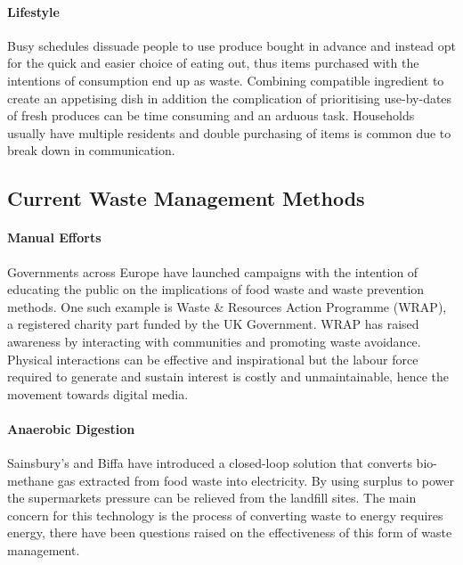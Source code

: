 \documentclass[a4paper, 11pt]{article}
\begin{document}
\paragraph{Lifestyle} Busy schedules dissuade people to use produce bought in advance and instead opt for the quick and easier choice of eating out, thus items purchased with the intentions of consumption end up as waste.\cite{motivation} Combining compatible ingredient to create an appetising dish in addition the complication of prioritising use-by-dates of fresh produces can be time consuming and an arduous task. Households usually have multiple residents and double purchasing of items is common due to break down in communication.

\vspace{\baselineskip}
\vspace{\baselineskip}
\vspace{\baselineskip}

\subsection{Current Waste Management Methods}

\paragraph{Manual Efforts}
Governments across Europe have launched campaigns with the intention of educating the public on the implications of food waste and waste prevention methods. One such example is Waste \& Resources Action Programme (WRAP), a registered charity part funded by the UK Government. WRAP has raised awareness by interacting with communities and promoting waste avoidance. Physical interactions can be effective and inspirational but the labour force required to generate and sustain interest is costly and unmaintainable, hence the movement towards digital media.\cite{FoodWaste}

\paragraph{Anaerobic Digestion}
Sainsbury's and Biffa have introduced a closed-loop solution that converts bio-methane gas extracted from food waste into electricity. By using surplus to power the supermarkets pressure can be relieved from the landfill sites. The main concern for this technology is the process of converting waste to energy requires energy, there have been questions raised on the effectiveness of this form of waste management.\cite{anarobic} 
\end{document}
